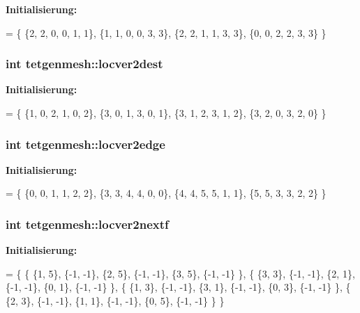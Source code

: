 {\bfseries Initialisierung\-:}
\begin{DoxyCode}
= \{ 
  \{2, 2, 0, 0, 1, 1\},
  \{1, 1, 0, 0, 3, 3\},
  \{2, 2, 1, 1, 3, 3\},
  \{0, 0, 2, 2, 3, 3\}
\}
\end{DoxyCode}
\hypertarget{classtetgenmesh_a5920534e381e2c715dd0b1c5e7b61c9f}{
\subsubsection[{locver2dest}]{\setlength{\rightskip}{0pt plus 5cm}int tetgenmesh\-::locver2dest\hspace{0.3cm}{\ttfamily [static]}}}\label{classtetgenmesh_a5920534e381e2c715dd0b1c5e7b61c9f}
{\bfseries Initialisierung\-:}
\begin{DoxyCode}
= \{ 
  \{1, 0, 2, 1, 0, 2\},
  \{3, 0, 1, 3, 0, 1\},
  \{3, 1, 2, 3, 1, 2\},
  \{3, 2, 0, 3, 2, 0\}
\}
\end{DoxyCode}
\hypertarget{classtetgenmesh_ac76a114f95d60ecb26c54a41de588cba}{
\subsubsection[{locver2edge}]{\setlength{\rightskip}{0pt plus 5cm}int tetgenmesh\-::locver2edge\hspace{0.3cm}{\ttfamily [static]}}}\label{classtetgenmesh_ac76a114f95d60ecb26c54a41de588cba}
{\bfseries Initialisierung\-:}
\begin{DoxyCode}
= \{
  \{0, 0, 1, 1, 2, 2\},
  \{3, 3, 4, 4, 0, 0\},
  \{4, 4, 5, 5, 1, 1\},
  \{5, 5, 3, 3, 2, 2\}
\}
\end{DoxyCode}
\hypertarget{classtetgenmesh_a3c0df45153809c966fdbfb9d5c21c196}{
\subsubsection[{locver2nextf}]{\setlength{\rightskip}{0pt plus 5cm}int tetgenmesh\-::locver2nextf\hspace{0.3cm}{\ttfamily [static]}}}\label{classtetgenmesh_a3c0df45153809c966fdbfb9d5c21c196}
{\bfseries Initialisierung\-:}
\begin{DoxyCode}
= \{
  \{ \{1, 5\}, \{-1, -1\}, \{2, 5\}, \{-1, -1\}, \{3, 5\}, \{-1, -1\} \},
  \{ \{3, 3\}, \{-1, -1\}, \{2, 1\}, \{-1, -1\}, \{0, 1\}, \{-1, -1\} \},
  \{ \{1, 3\}, \{-1, -1\}, \{3, 1\}, \{-1, -1\}, \{0, 3\}, \{-1, -1\} \},
  \{ \{2, 3\}, \{-1, -1\}, \{1, 1\}, \{-1, -1\}, \{0, 5\}, \{-1, -1\} \}
\}
\end{DoxyCode}
